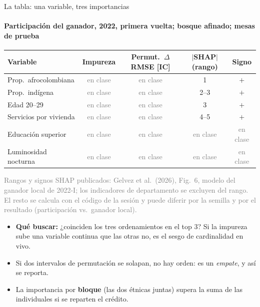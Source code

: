 \documentclass{beamer}
\newcommand{\1}{\mathbb{I}}
\begin{document}
\begin{frame}{La tabla: una variable, tres importancias}
\framesubtitle{Participación del ganador, 2022, primera vuelta; bosque afinado; mesas de prueba}
\small
\begin{center}
\scriptsize
\setlength{\tabcolsep}{3pt}
\begin{tabular}{lcccc}
\hline
Variable & Impureza & Permut.\ $\Delta$RMSE [IC] & $|$SHAP$|$ (rango) & Signo \\
\hline
Prop.\ afrocolombiana & \textcolor{gray}{en clase} & \textcolor{gray}{en clase} & 1 & $+$ \\
Prop.\ indígena & \textcolor{gray}{en clase} & \textcolor{gray}{en clase} & 2--3 & $+$ \\
Edad 20--29 & \textcolor{gray}{en clase} & \textcolor{gray}{en clase} & 3 & $+$ \\
Servicios por vivienda & \textcolor{gray}{en clase} & \textcolor{gray}{en clase} & 4--5 & $+$ \\
Educación superior & \textcolor{gray}{en clase} & \textcolor{gray}{en clase} & \textcolor{gray}{en clase} & \textcolor{gray}{en clase} \\
Luminosidad nocturna & \textcolor{gray}{en clase} & \textcolor{gray}{en clase} & \textcolor{gray}{en clase} & \textcolor{gray}{en clase} \\
\hline
\end{tabular}
\end{center}
{\scriptsize\textcolor{gray}{Rangos y signos SHAP publicados: Gelvez et al.\ (2026), Fig.\ 6, modelo del ganador local de 2022-I; los indicadores de departamento se excluyen del rango. El resto se calcula con el código de la sesión y puede diferir por la semilla y por el resultado (participación vs.\ ganador local).}}
\pause
\vspace{0.05cm}
\begin{itemize}\itemsep1pt
  \item \textbf{Qué buscar:} ¿coinciden los tres ordenamientos en el top 3? Si la impureza sube una variable continua que las otras no, es el sesgo de cardinalidad en vivo.
  \item Si dos intervalos de permutación se solapan, no hay orden: es un \emph{empate}, y así se reporta.
  \item La importancia por \textbf{bloque} (las dos étnicas juntas) supera la suma de las individuales si se reparten el crédito.
\end{itemize}
\end{frame}
\end{document}
